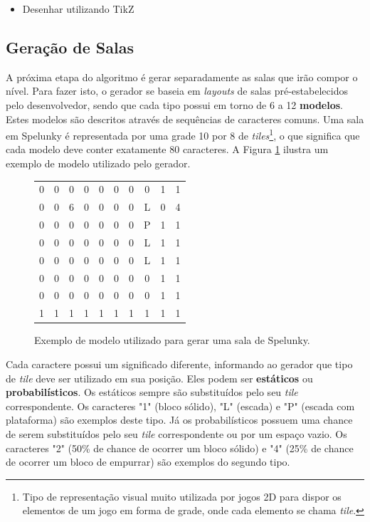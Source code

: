 \begin{mdframed}[backgroundcolor=green!20]
\begin{itemize}
    \item
		Desenhar utilizando TikZ
\end{itemize}
\end{mdframed}

\subsection{\label{section:spelunky-procgen-rooms}Geração de Salas}
A próxima etapa do algoritmo é gerar separadamente as salas que irão compor o
nível. Para fazer isto, o gerador se baseia em \textit{layouts} de salas
pré-estabelecidos pelo desenvolvedor, sendo que cada tipo possui em torno de 6 a
12 \textbf{modelos}. Estes modelos são descritos através de sequências de
caracteres comuns. Uma sala em Spelunky é representada por uma grade 10 por 8 de
\textit{tiles}\footnote{Tipo de representação visual muito utilizada por jogos
2D para dispor os elementos de um jogo em forma de grade, onde cada elemento se
chama \textit{tile}.}, o que significa que cada modelo deve conter exatamente 80
caracteres. A Figura \ref{fig:spelunky-procgen-room-template} ilustra um exemplo
de modelo utilizado pelo gerador.

\begin{figure}[htb!]
\centering
\begin{tabular}{c c c c c c c c c c}
    0 & 0 & 0 & 0 & 0 & 0 & 0 & 0 & 1 & 1 \\
    0 & 0 & 6 & 0 & 0 & 0 & 0 & L & 0 & 4 \\
    0 & 0 & 0 & 0 & 0 & 0 & 0 & P & 1 & 1 \\
    0 & 0 & 0 & 0 & 0 & 0 & 0 & L & 1 & 1 \\
    0 & 0 & 0 & 0 & 0 & 0 & 0 & L & 1 & 1 \\
    0 & 0 & 0 & 0 & 0 & 0 & 0 & 0 & 1 & 1 \\
    0 & 0 & 0 & 0 & 0 & 0 & 0 & 0 & 1 & 1 \\
    1 & 1 & 1 & 1 & 1 & 1 & 1 & 1 & 1 & 1 \\
\end{tabular}
\caption{\label{fig:spelunky-procgen-room-template}Exemplo de modelo utilizado
para gerar uma sala de Spelunky.}
\end{figure}

Cada caractere possui um significado diferente, informando ao gerador que tipo
de \textit{tile} deve ser utilizado em sua posição. Eles podem ser
\textbf{estáticos} ou \textbf{probabilísticos}. Os estáticos sempre são
substituídos pelo seu \textit{tile} correspondente. Os caracteres "1" (bloco
sólido), "L" (escada) e "P" (escada com plataforma) são exemplos deste tipo. Já
os probabilísticos possuem uma chance de serem substituídos pelo seu
\textit{tile} correspondente ou por um espaço vazio. Os caracteres "2" (50\% de
chance de ocorrer um bloco sólido) e "4" (25\% de chance de ocorrer um bloco de
empurrar) são exemplos do segundo tipo.

